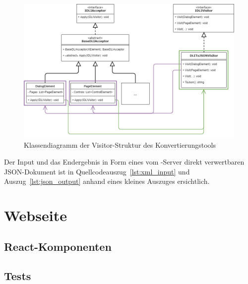 \begin{figure}
    \centering
    \captionsetup{justification=centering}
    \includegraphics[width=\textwidth]{figures/web-converter_class-diagramm.png}
        \caption{Klassendiagramm der Visitor-Struktur des Konvertierungstools}\label{fig:web-conv_class-diagramm}
\end{figure}

Der Input und das Endergebnis in Form eines vom -Server direkt verwertbaren JSON-Dokument ist in Quellcodeauszug~\ref{lst:xml_input} und Auszug~\ref{lst:json_output} anhand eines kleines Auszuges ersichtlich.




\section{Webseite}

\subsection{React-Komponenten}

\subsection{Tests}

